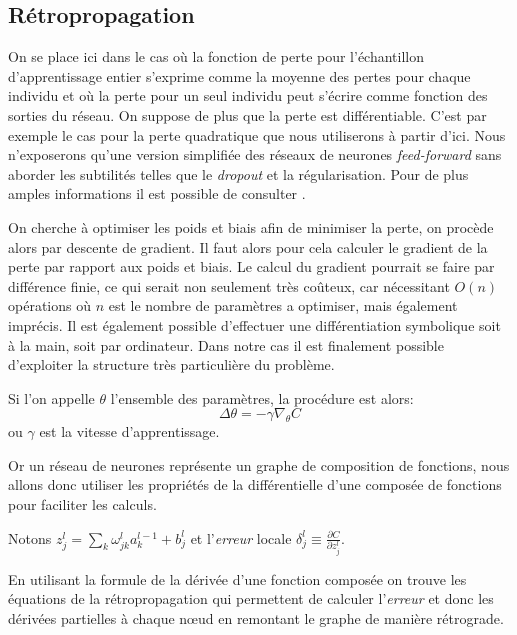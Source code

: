 
\subsection{Rétropropagation}

On se place ici dans le cas où la fonction de perte pour l'échantillon d'apprentissage entier s'exprime comme la moyenne des pertes pour chaque individu et où la perte pour un seul individu peut s'écrire comme fonction des sorties du réseau. On suppose de plus que la perte est différentiable. C'est par exemple le cas pour la perte quadratique que nous utiliserons à partir d'ici. Nous n'exposerons qu'une version simplifiée des réseaux de neurones \emph{feed-forward} sans aborder les subtilités telles que le \emph{dropout} et la régularisation. Pour de plus amples informations il est possible de consulter \citep{Rojas1996,Nielsen2015,Bengio2015}.

On cherche à optimiser les poids et biais afin de minimiser la perte, on procède alors par descente de gradient. Il faut alors pour cela calculer le gradient de la perte par rapport aux poids et biais. Le calcul du gradient pourrait se faire par différence finie, ce qui serait non seulement très coûteux, car nécessitant $O (n)$ opérations où $n$ est le nombre de paramètres a optimiser, mais également imprécis. Il est également possible d'effectuer une différentiation symbolique soit à la main, soit par ordinateur. Dans notre cas il est finalement possible d'exploiter la structure très particulière du problème.

Si l'on appelle $\theta$ l'ensemble des paramètres, la procédure est alors:
\begin{equation*}
    \Delta \theta = -\gamma \nabla_{\theta} C
\end{equation*}
ou $\gamma$ est la vitesse d'apprentissage.

Or un réseau de neurones représente un graphe de composition de fonctions, nous allons donc utiliser les propriétés de la différentielle d'une composée de fonctions pour faciliter les calculs.

Notons $z^l_j = \sum_k \omega^l_{jk} a^{l-1}_k + b^l_j$ et l'\emph{erreur} locale $\delta^l_j \equiv \frac{\partial C}{\partial z^l_j}$.

En utilisant la formule de la dérivée d'une fonction composée on trouve les équations de la rétropropagation qui permettent de calculer l'\emph{erreur} et donc les dérivées partielles à chaque nœud en remontant le graphe de manière rétrograde.

